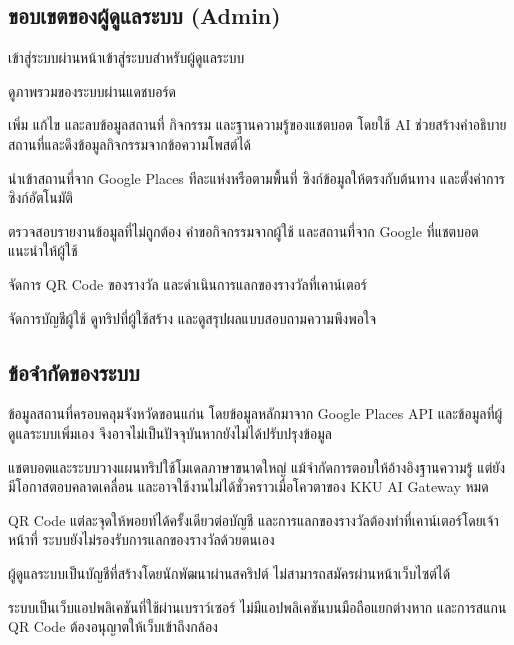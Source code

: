 \subsection{ขอบเขตของผู้ดูแลระบบ (Admin)}

\begin{parenlist}
\item เข้าสู่ระบบผ่านหน้าเข้าสู่ระบบสำหรับผู้ดูแลระบบ
\item ดูภาพรวมของระบบผ่านแดชบอร์ด
\item เพิ่ม แก้ไข และลบข้อมูลสถานที่ กิจกรรม และฐานความรู้ของแชตบอต โดยใช้ AI ช่วยสร้างคำอธิบายสถานที่และดึงข้อมูลกิจกรรมจากข้อความโพสต์ได้
\item นำเข้าสถานที่จาก Google Places ทีละแห่งหรือตามพื้นที่ ซิงก์ข้อมูลให้ตรงกับต้นทาง และตั้งค่าการซิงก์อัตโนมัติ
\item ตรวจสอบรายงานข้อมูลที่ไม่ถูกต้อง คำขอกิจกรรมจากผู้ใช้ และสถานที่จาก Google ที่แชตบอตแนะนำให้ผู้ใช้
\item จัดการ QR Code ของรางวัล และดำเนินการแลกของรางวัลที่เคาน์เตอร์
\item จัดการบัญชีผู้ใช้ ดูทริปที่ผู้ใช้สร้าง และดูสรุปผลแบบสอบถามความพึงพอใจ
\end{parenlist}

\subsection{ข้อจำกัดของระบบ}

\begin{parenlist}
\item ข้อมูลสถานที่ครอบคลุมจังหวัดขอนแก่น โดยข้อมูลหลักมาจาก Google Places API และข้อมูลที่ผู้ดูแลระบบเพิ่มเอง จึงอาจไม่เป็นปัจจุบันหากยังไม่ได้ปรับปรุงข้อมูล
\item แชตบอตและระบบวางแผนทริปใช้โมเดลภาษาขนาดใหญ่ แม้จำกัดการตอบให้อ้างอิงฐานความรู้ แต่ยังมีโอกาสตอบคลาดเคลื่อน และอาจใช้งานไม่ได้ชั่วคราวเมื่อโควตาของ KKU AI Gateway หมด
\item QR Code แต่ละจุดให้พอยท์ได้ครั้งเดียวต่อบัญชี และการแลกของรางวัลต้องทำที่เคาน์เตอร์โดยเจ้าหน้าที่ ระบบยังไม่รองรับการแลกของรางวัลด้วยตนเอง
\item ผู้ดูแลระบบเป็นบัญชีที่สร้างโดยนักพัฒนาผ่านสคริปต์ ไม่สามารถสมัครผ่านหน้าเว็บไซต์ได้
\item ระบบเป็นเว็บแอปพลิเคชันที่ใช้ผ่านเบราว์เซอร์ ไม่มีแอปพลิเคชันบนมือถือแยกต่างหาก และการสแกน QR Code ต้องอนุญาตให้เว็บเข้าถึงกล้อง
\end{parenlist}
